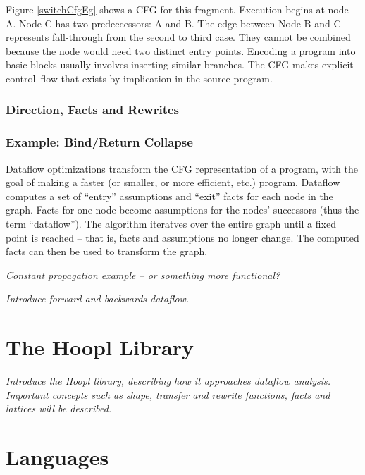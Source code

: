 \documentclass[12pt]{report}
\begin{document}
Figure \ref{switchCfgEg} shows a CFG for this fragment. Execution
begins at node A. Node C has two predeccessors: A and B. The edge
between Node B and C represents fall-through from the second to third
case. They cannot be combined because the node would need two distinct
entry points. Encoding a program into basic blocks usually involves
inserting similar branches. The CFG makes explicit control--flow that
exists by implication in the source program.

\subsection{Direction, Facts and Rewrites}

\subsection{Example: Bind/Return Collapse}

Dataflow optimizations transform the CFG representation of a program,
with the goal of making a faster (or smaller, or more efficient, etc.)
program. Dataflow computes a set of ``entry'' assumptions and ``exit''
facts for each node in the graph. Facts for one node become
assumptions for the nodes' successors (thus the term
``dataflow''). The algorithm iteratves over the entire graph until a
fixed point is reached -- that is, facts and assumptions no longer
change. The computed facts can then be used to transform the graph.

\emph{Constant propagation example -- or something more functional?}

\emph{Introduce forward and backwards dataflow.}




\chapter{The Hoopl Library}

\emph{Introduce the Hoopl library, describing how
it approaches dataflow analysis. Important concepts
such as shape, transfer and rewrite functions, facts and
lattices will be described. }

\chapter{Languages}
\end{document}
